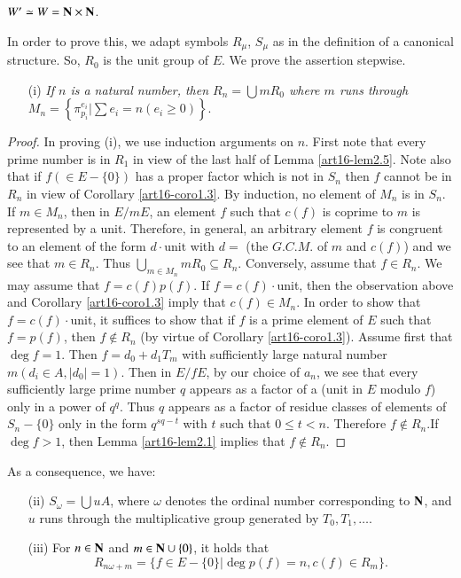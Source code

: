 \begin{proposition}\label{art16-prop2.8}
$W' \simeq W = \mathbf{N} \times \mathbf{N}$.
\end{proposition}

In order to prove this, we adapt symbols $R_\mu$, $S_\mu$ as in the definition of a canonical structure. So, $R_0$ is the unit group of $E$. We prove the assertion stepwise.
\begin{itemize}
\item[(i)] {\em If $n$ is a natural number, then $R_n = \bigcup m R_0$ where $m$ runs through $M_n = \left\{\pi_{p_i}^{e_i} | \sum e_i = n (e_i \geqslant 0) \right\}$}.
\end{itemize}

\begin{proof}
In proving (i), we use induction arguments on $n$. First note that every prime number is in $R_1$ in view of the last half of Lemma \ref{art16-lem2.5}. Note also that if $f(\in E - \{0\})$ has a proper factor which is not in $S_n$ then $f$ cannot be in $R_n$ in view of Corollary \ref{art16-coro1.3}. By induction, no element of $M_n$ is in $S_n$. If $m \in M_n$, then in $E/ mE$, an element $f$ such that $c(f)$ is coprime to $m$ is represented by a unit. Therefore, in general, an arbitrary element $f$ is congruent to an element of the form $d\cdot\text{unit}$ with $d =$ (the $G.C.M.$ of $m$ and $c(f)$) and we see that $m \in R_n$. Thus $\bigcup_{m \in M_n} m R_0 \subseteq R_n $. Conversely, assume that $f \in R_n$. We may assume that $f = c(f) p (f)$. If $f= c(f) \cdot$unit, then the observation above and Corollary \ref{art16-coro1.3} imply that $c(f) \in M_n$. In order to show that $f = c(f)\cdot$unit, it suffices to show that if $f$ is a prime element of $E$ such that $f = p(f)$, then $f \not\in R_n$ (by virtue of Corollary \ref{art16-coro1.3}). Assume first that $\deg f =1$. Then $f = d_0+d_1 T_m$ with sufficiently large natural number $m(d_i \in A, |d_0|=1)$. Then in $E/fE$, by our choice of $a_n$, we see that every sufficiently large prime number $q$ appears as a factor of a (unit in $E$ modulo $f$) only in a power of $q^q$. Thus $q$ appears as a factor of residue classes of elements of $S_n - \{0\}$ only in the form
 $q^{sq-t}$ with $t$ such that $0 \leqslant t < n$. Therefore $f \not\in R_n$.\pageoriginale If $\deg f >1$, then Lemma \ref{art16-lem2.1} implies that $f \not\in R_n$. 
\end{proof} 

As a consequence, we have:
\begin{itemize}
\item[(ii)] $S_\omega = \bigcup u A$, where $\omega$ denotes the ordinal number corresponding to $\mathbf{N}$, and $u$ runs through the multiplicative group generated by $T_0, T_1,\ldots$.

\item[(iii)] For $n \in \mathbf{N}$ and $m \in \mathbf{N} \cup \{0\}$, it holds that
$$
R_{n\omega + m} = \{f \in E - \{0\} | \deg p (f) = n, c(f) \in R_m\}.
$$
\end{itemize}

